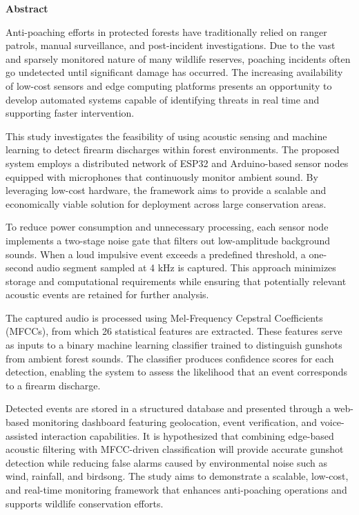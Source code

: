 \documentclass[11pt,a4paper,oneside]{report}
\begin{document}
\newpage
{}
\setcounter{page}{1}

\begin{center}
    \Large\textbf{Abstract}
\end{center}
\vspace{1cm}

\noindent Anti-poaching efforts in protected forests have traditionally relied on ranger patrols, manual surveillance, and post-incident investigations. Due to the vast and sparsely monitored nature of many wildlife reserves, poaching incidents often go undetected until significant damage has occurred. The increasing availability of low-cost sensors and edge computing platforms presents an opportunity to develop automated systems capable of identifying threats in real time and supporting faster intervention.

\vspace{0.5cm}
\noindent This study investigates the feasibility of using acoustic sensing and machine learning to detect firearm discharges within forest environments. The proposed system employs a distributed network of ESP32 and Arduino-based sensor nodes equipped with microphones that continuously monitor ambient sound. By leveraging low-cost hardware, the framework aims to provide a scalable and economically viable solution for deployment across large conservation areas.

\vspace{0.5cm}
\noindent To reduce power consumption and unnecessary processing, each sensor node implements a two-stage noise gate that filters out low-amplitude background sounds. When a loud impulsive event exceeds a predefined threshold, a one-second audio segment sampled at 4 kHz is captured. This approach minimizes storage and computational requirements while ensuring that potentially relevant acoustic events are retained for further analysis.

\vspace{0.5cm}
\noindent The captured audio is processed using Mel-Frequency Cepstral Coefficients (MFCCs), from which 26 statistical features are extracted. These features serve as inputs to a binary machine learning classifier trained to distinguish gunshots from ambient forest sounds. The classifier produces confidence scores for each detection, enabling the system to assess the likelihood that an event corresponds to a firearm discharge.

\vspace{0.5cm}
\noindent Detected events are stored in a structured database and presented through a web-based monitoring dashboard featuring geolocation, event verification, and voice-assisted interaction capabilities. It is hypothesized that combining edge-based acoustic filtering with MFCC-driven classification will provide accurate gunshot detection while reducing false alarms caused by environmental noise such as wind, rainfall, and birdsong. The study aims to demonstrate a scalable, low-cost, and real-time monitoring framework that enhances anti-poaching operations and supports wildlife conservation efforts.
\end{document}
